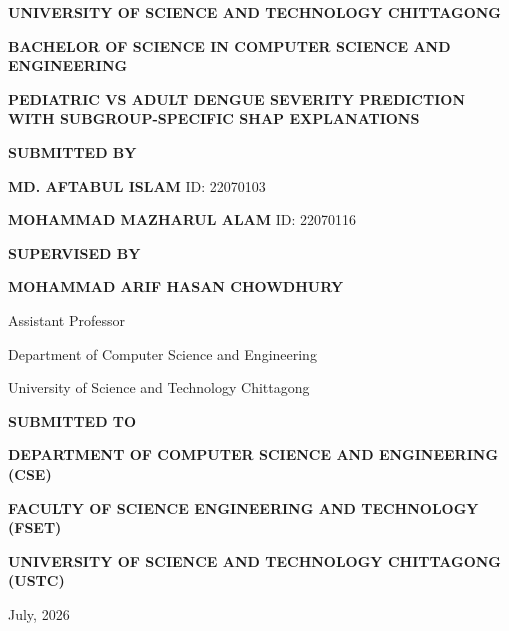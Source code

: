 \documentclass[12pt, a4paper]{report}
\begin{document}
\begin{titlepage}
    \centering
    \vspace*{1cm}
    
    {\Large \textbf{UNIVERSITY OF SCIENCE AND TECHNOLOGY CHITTAGONG}\par}
    {\large \textbf{BACHELOR OF SCIENCE IN COMPUTER SCIENCE AND ENGINEERING}\par}
    \vspace{2cm}
    
    {\Large \textbf{PEDIATRIC VS ADULT DENGUE SEVERITY PREDICTION WITH SUBGROUP-SPECIFIC SHAP EXPLANATIONS}\par}
    \vspace{2cm}
    
    {\large \textbf{SUBMITTED BY}\par}
    \vspace{0.3cm}
    {\large \textbf{MD. AFTABUL ISLAM} \quad ID: 22070103 \par}
    {\large \textbf{MOHAMMAD MAZHARUL ALAM} \quad ID: 22070116 \par}
    
    \vspace{1.5cm}
    {\large \textbf{SUPERVISED BY}\par}
    \vspace{0.3cm}
    {\large \textbf{MOHAMMAD ARIF HASAN CHOWDHURY}\par}
    {\large Assistant Professor\par}
    {\large Department of Computer Science and Engineering\par}
    {\large University of Science and Technology Chittagong\par}
    
    \vfill
    {\large \textbf{SUBMITTED TO}\par}
    \vspace{0.3cm}
    {\large \textbf{DEPARTMENT OF COMPUTER SCIENCE AND ENGINEERING (CSE)}\par}
    {\large \textbf{FACULTY OF SCIENCE ENGINEERING AND TECHNOLOGY (FSET)}\par}
    {\large \textbf{UNIVERSITY OF SCIENCE AND TECHNOLOGY CHITTAGONG (USTC)}\par}
    \vspace{0.5cm}
    {\large July, 2026\par}
\end{titlepage}
\end{document}
